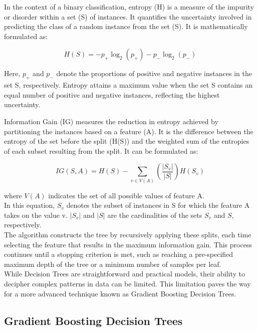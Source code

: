 In the context of a binary classification, entropy (H) is a measure of the impurity or disorder within a set (S) of instances. It quantifies the uncertainty involved in predicting the class of a random instance from the set (S). It is mathematically formulated as:

\begin{equation}
	H(S) = - p_{+} \log_{2}(p_{+}) - p_{-} \log_{2}(p_{-})
\end{equation}

Here, $p_+$ and $p_-$ denote the proportions of positive and negative instances in the set S, respectively. Entropy attains a maximum value when the set S contains an equal number of positive and negative instances, reflecting the highest uncertainty.

Information Gain (IG) measures the reduction in entropy achieved by partitioning the instances based on a feature (A). It is the difference between the entropy of the set before the split (H(S)) and the weighted sum of the entropies of each subset resulting from the split. It can be formulated as:

\begin{equation}
	IG(S, A) = H(S) - \sum_{v \in V(A)} \left(\frac{|S_v|}{|S|}\right) H(S_v)
\end{equation}

where $V(A)$ indicates the set of all possible values of feature A.\\
In this equation, $S_v$ denotes the subset of instances in S for which the feature A takes on the value v. $|S_v|$ and $|S|$ are the cardinalities of the sets $S_v$ and $S$, respectively.\\

The algorithm constructs the tree by recursively applying these splits, each time selecting the feature that results in the maximum information gain. This process continues until a stopping criterion is met, such as reaching a pre-specified maximum depth of the tree or a minimum number of samples per leaf.\\


While Decision Trees are straightforward and practical models, their ability to decipher complex patterns in data can be limited. This limitation paves the way for a more advanced technique known as Gradient Boosting Decision Trees. 

\subsection{Gradient Boosting Decision Trees}

